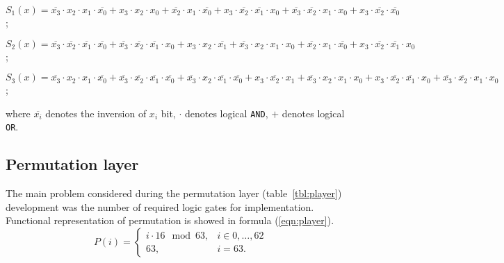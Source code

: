 \noindent
$ S_1(x) = \overline{x_3} \cdot x_2 \cdot x_1 \cdot \overline{x_0} + x_3 \cdot  
x_2 \cdot x_0 + \overline{x_2} \cdot {x_1} \cdot \overline{x_0} + x_3 \cdot 
\overline{x_2} \cdot \overline{x_1} \cdot x_0 + \overline{x_3} \cdot 
\overline{x_2} \cdot x_1 \cdot x_0 + x_3 \cdot \overline{x_2} \cdot
\overline{x_0} $;

\noindent
$ S_2(x) = \overline{x_3} \cdot \overline{x_2} \cdot \overline{x_1} \cdot
\overline{x_0} + \overline{x_3} \cdot \overline{x_2} \cdot \overline{x_1} \cdot 
x_0 + x_3 \cdot x_2 \cdot \overline{x_1} + \overline{x_3} \cdot x_2 \cdot x_1
\cdot x_0 + \overline{x_2} \cdot x_1 \cdot \overline{x_0} + x_3 \cdot
\overline{x_2} \cdot \overline{x_1} \cdot x_0 $;

\noindent
$ S_3(x) = \overline{x_3} \cdot x_2 \cdot x_1 \cdot \overline{x_0} +
\overline{x_3} \cdot \overline{x_2} \cdot \overline{x_1} \cdot \overline{x_0} +
\overline{x_3} \cdot x_2 \cdot \overline{x_1} \cdot \overline{x_0} + x_3 \cdot
\overline{x_2} \cdot x_1 + \overline{x_3} \cdot x_2 \cdot x_1 \cdot x_0 + x_3
\cdot \overline{x_2} \cdot \overline{x_1} \cdot x_0 + \overline{x_3} \cdot
\overline{x_2} \cdot x_1 \cdot x_0 $;

\noindent where $ \overline{x_i} $ denotes the inversion of $ x_i $ bit, 
$ \cdot $ denotes logical \verb+AND+, $ + $ denotes logical \verb+OR+.

\subsection{Permutation layer}

The main problem considered during the permutation layer
(table~\ref{tbl:player}) development was the number of required logic gates for
implementation. Functional representation of permutation is showed in formula
(\ref{eqn:player}).
\begin{equation}
    \label{eqn:player}
    P(i) = \left\{
    \begin{array}{ll}
        i \cdot 16 \mod 63, & i \in {0, \hdots, 62} \\
        63,  & i = 63.
    \end{array} \right.
\end{equation}

